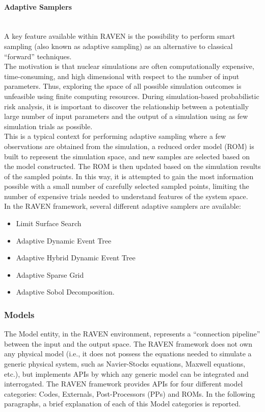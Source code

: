 \paragraph{Adaptive Samplers}~\\ 
A key feature available within RAVEN is the possibility to perform smart sampling (also known as adaptive sampling) as an alternative to classical ``forward'' techniques.
\\The motivation is that nuclear simulations are often computationally expensive, time-consuming, and high dimensional with respect to the number of input parameters. Thus, exploring the space of all possible simulation outcomes is unfeasible using finite computing resources. During simulation-based probabilistic risk analysis, it is important to discover the relationship between a potentially large number of input parameters and the output of a simulation using as few simulation trials as possible. 
\\This is a typical context for performing adaptive sampling where a few observations are obtained from the simulation, a reduced order model (ROM) is built to represent the simulation space, and new samples are selected based on the model constructed. The ROM is then updated based on the simulation results of the sampled points. In this way, it is attempted to gain the most information possible with a small number of carefully selected sampled points, limiting the number of expensive trials needed to understand features of the system space.
\\In the RAVEN framework, several different adaptive samplers are available:
\begin{itemize}
\item Limit Surface Search
\item Adaptive Dynamic Event Tree
\item Adaptive Hybrid Dynamic Event Tree 
\item Adaptive Sparse Grid
\item Adaptive Sobol Decomposition.
\end{itemize}

\subsubsection{Models} 
The Model entity, in the RAVEN environment, represents a ``connection pipeline'' between the input and the output space. The RAVEN framework does not own any physical model (i.e., it does not possess the equations needed to simulate a generic physical system, such as Navier-Stocks equations, Maxwell equations, etc.), but implements APIs by which any generic model can be integrated and interrogated. The RAVEN framework provides APIs for four different model categories: Codes, Externals, Post-Processors (PPs) and ROMs. In the following paragraphs, a brief explanation of each of this Model categories is reported. 
